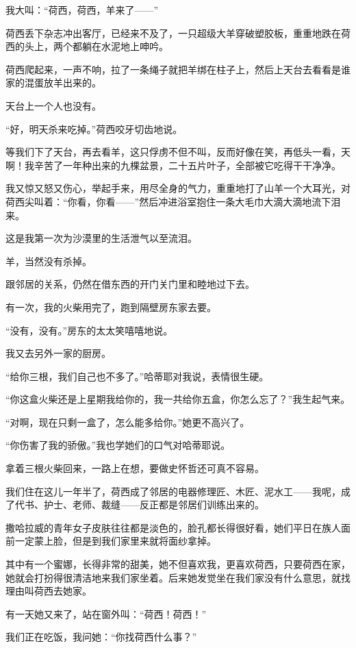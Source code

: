 \par 我大叫：“荷西，荷西，羊来了——”
\par 荷西丢下杂志冲出客厅，已经来不及了，一只超级大羊穿破塑胶板，重重地跌在荷西的头上，两个都躺在水泥地上呻吟。
\par 荷西爬起来，一声不响，拉了一条绳子就把羊绑在柱子上，然后上天台去看看是谁家的混蛋放羊出来的。
\par 天台上一个人也没有。
\par “好，明天杀来吃掉。”荷西咬牙切齿地说。
\par 等我们下了天台，再去看羊，这只俘虏不但不叫，反而好像在笑，再低头一看，天啊！我辛苦了一年种出来的九棵盆景，二十五片叶子，全部被它吃得干干净净。
\par 我又惊又怒又伤心，举起手来，用尽全身的气力，重重地打了山羊一个大耳光，对荷西尖叫着：“你看，你看——”然后冲进浴室抱住一条大毛巾大滴大滴地流下泪来。
\par 这是我第一次为沙漠里的生活泄气以至流泪。
\par 羊，当然没有杀掉。
\par 跟邻居的关系，仍然在借东西的开门关门里和睦地过下去。
\par 有一次，我的火柴用完了，跑到隔壁房东家去要。
\par “没有，没有。”房东的太太笑嘻嘻地说。
\par 我又去另外一家的厨房。
\par “给你三根，我们自己也不多了。”哈蒂耶对我说，表情很生硬。
\par “你这盒火柴还是上星期我给你的，我一共给你五盒，你怎么忘了？”我生起气来。
\par “对啊，现在只剩一盒了，怎么能多给你。”她更不高兴了。
\par “你伤害了我的骄傲。”我也学她们的口气对哈蒂耶说。
\par 拿着三根火柴回来，一路上在想，要做史怀哲还可真不容易。
\par 我们住在这儿一年半了，荷西成了邻居的电器修理匠、木匠、泥水工——我呢，成了代书、护士、老师、裁缝——反正都是邻居们训练出来的。
\par 撒哈拉威的青年女子皮肤往往都是淡色的，脸孔都长得很好看，她们平日在族人面前一定蒙上脸，但是到我们家里来就将面纱拿掉。
\par 其中有一个蜜娜，长得非常的甜美，她不但喜欢我，更喜欢荷西，只要荷西在家，她就会打扮得很清洁地来我们家坐着。后来她发觉坐在我们家没有什么意思，就找理由叫荷西去她家。
\par 有一天她又来了，站在窗外叫：“荷西！荷西！”
\par 我们正在吃饭，我问她：“你找荷西什么事？”
